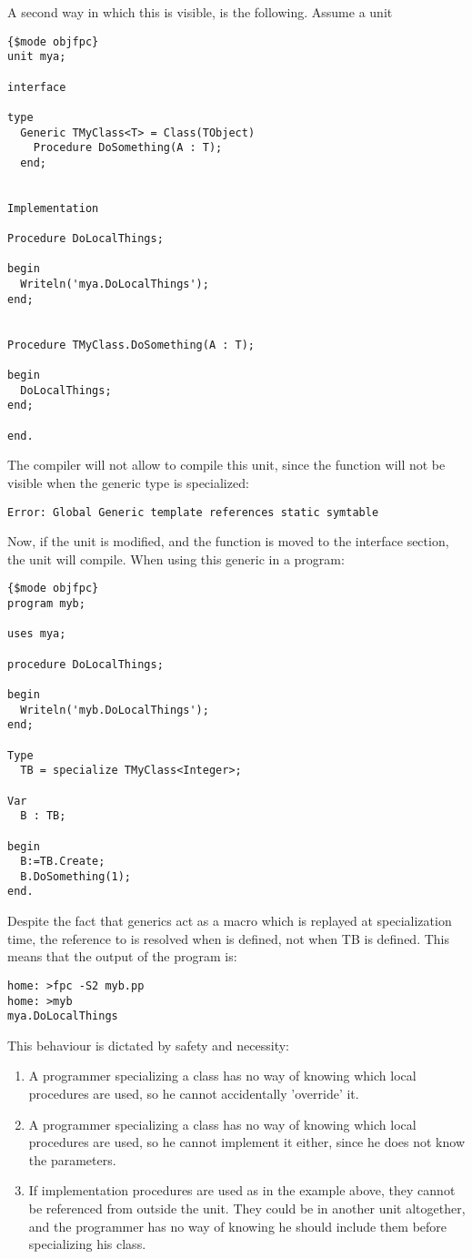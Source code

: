 A second way in which this is visible, is the following. Assume a unit
\begin{verbatim}
{$mode objfpc}
unit mya;

interface

type
  Generic TMyClass<T> = Class(TObject)
    Procedure DoSomething(A : T);
  end;


Implementation

Procedure DoLocalThings;

begin
  Writeln('mya.DoLocalThings');
end;


Procedure TMyClass.DoSomething(A : T);

begin
  DoLocalThings;
end;

end.
\end{verbatim}
The compiler will not allow to compile this unit, since the  function will not be visible when the generic type is specialized:
\begin{verbatim}
Error: Global Generic template references static symtable
\end{verbatim}
Now, if the unit is modified, and the  function  is moved to the interface section, the unit will compile.
When using this generic in a program:
\begin{verbatim}
{$mode objfpc}
program myb;

uses mya;

procedure DoLocalThings;

begin
  Writeln('myb.DoLocalThings');
end;

Type
  TB = specialize TMyClass<Integer>;

Var
  B : TB;

begin
  B:=TB.Create;
  B.DoSomething(1);
end.
\end{verbatim}
Despite the fact that generics act as a macro which is replayed at specialization time, the reference to  is resolved
when  is defined, not when TB is defined. This means that the output of the program is:
\begin{verbatim}
home: >fpc -S2 myb.pp
home: >myb
mya.DoLocalThings
\end{verbatim}
This behaviour is dictated by safety and necessity:
\begin{enumerate}
\item A programmer specializing a class has no way of knowing which local
procedures are used, so he cannot accidentally 'override' it.
\item A programmer specializing a class has no way of knowing which local
procedures are used, so he cannot implement it either, since he does not
know the parameters.
\item If implementation procedures are used as in the example above, they 
cannot be referenced from outside the unit. They could be in another unit
altogether, and the programmer has no way of knowing he should include them
before specializing his class.
\end{enumerate}


